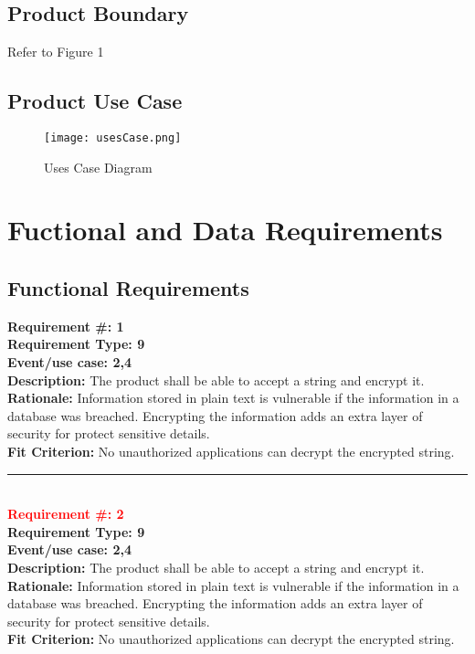 \documentclass[12pt]{article}
\begin{document}
\subsection{Product Boundary}
  Refer to Figure 1 

\subsection{Product Use Case}
  \begin{figure}[H]
  \centerline{\texttt{[image: usesCase.png]}}
  \caption{Uses Case Diagram}
  \end{figure}


\section{Fuctional and Data Requirements}

\subsection{Functional Requirements}

  
  \textbf{Requirement \#: 1}\\
  \textbf{Requirement Type: 9 }\\
  \textbf{Event/use case: 2,4}\\
  \textbf{Description:} The product shall be able to accept a string and encrypt it.\\
  \textbf{Rationale:} Information stored in plain text is vulnerable if the information in a database was breached. Encrypting the information adds an extra layer of security for protect sensitive details.\\
  \textbf{Fit Criterion:} No unauthorized applications can decrypt the encrypted string.



  \noindent\rule{12cm}{0.4pt} \\ 

  \noindent\textcolor{red}{\textbf{Requirement \#: 2}}\\
  \textbf{Requirement Type: 9 }\\
  \textbf{Event/use case: 2,4}\\
  \textbf{Description:} The product shall be able to accept a string and encrypt it.\\
  \textbf{Rationale:} Information stored in plain text is vulnerable if the information in a database was breached. Encrypting the information adds an extra layer of security for protect sensitive details.\\
  \textbf{Fit Criterion:} No unauthorized applications can decrypt the encrypted string.
\end{document}
